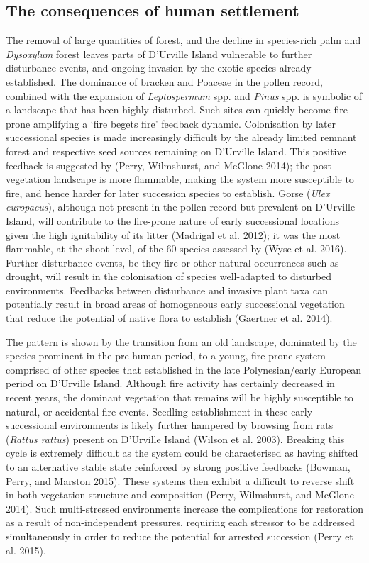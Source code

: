 \documentclass[]{article}
\begin{document}
\subsection{The consequences of human settlement}\label{the-consequences-of-human-settlement}

The removal of large quantities of forest, and the decline in species-rich palm and \emph{Dysoxylum} forest leaves parts of D'Urville Island vulnerable to further disturbance events, and ongoing invasion by the exotic species already established. The dominance of bracken and Poaceae in the pollen record, combined with the expansion of \emph{Leptospermum} spp. and \emph{Pinus} spp. is symbolic of a landscape that has been highly disturbed. Such sites can quickly become fire-prone amplifying a `fire begets fire' feedback dynamic. Colonisation by later successional species is made increasingly difficult by the already limited remnant forest and respective seed sources remaining on D'Urville Island. This positive feedback is suggested by (Perry, Wilmshurst, and McGlone 2014); the post-vegetation landscape is more flammable, making the system more susceptible to fire, and hence harder for later succession species to establish. Gorse (\emph{Ulex europaeus}), although not present in the pollen record but prevalent on D'Urville Island, will contribute to the fire-prone nature of early successional locations given the high ignitability of its litter (Madrigal et al. 2012); it was the most flammable, at the shoot-level, of the 60 species assessed by (Wyse et al. 2016). Further disturbance events, be they fire or other natural occurrences such as drought, will result in the colonisation of species well-adapted to disturbed environments. Feedbacks between disturbance and invasive plant taxa can potentially result in broad areas of homogeneous early successional vegetation that reduce the potential of native flora to establish (Gaertner et al. 2014).

The pattern is shown by the transition from an old landscape, dominated by the species prominent in the pre-human period, to a young, fire prone system comprised of other species that established in the late Polynesian/early European period on D'Urville Island. Although fire activity has certainly decreased in recent years, the dominant vegetation that remains will be highly susceptible to natural, or accidental fire events. Seedling establishment in these early-successional environments is likely further hampered by browsing from rats (\emph{Rattus rattus}) present on D'Urville Island (Wilson et al. 2003). Breaking this cycle is extremely difficult as the system could be characterised as having shifted to an alternative stable state reinforced by strong positive feedbacks (Bowman, Perry, and Marston 2015). These systems then exhibit a difficult to reverse shift in both vegetation structure and composition (Perry, Wilmshurst, and McGlone 2014). Such multi-stressed environments increase the complications for restoration as a result of non-independent pressures, requiring each stressor to be addressed simultaneously in order to reduce the potential for arrested succession (Perry et al. 2015).
\end{document}
